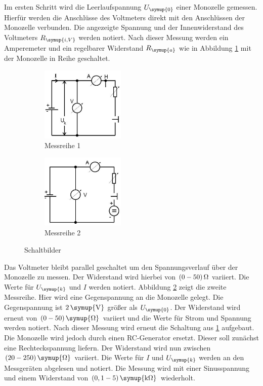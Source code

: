 Im ersten Schritt wird die Leerlaufspannung $U_\symup{0}$ einer Monozelle
gemessen. Hierfür werden die Anschlüsse des Voltmeters direkt mit den Anschlüssen
der Monozelle verbunden. Die angezeigte Spannung und der Innenwiderstand des
Voltmeters $R_\symup{i,V}$ werden notiert.
Nach dieser Messung werden ein Amperemeter und ein regelbarer Widerstand
$R_\symup{a}$ wie in Abbildung \ref{fig:schlt1} mit der Monozelle in Reihe geschaltet.
\begin{figure}[H]
  \centering
  \begin{subfigure}{0.48\textwidth}
    \centering
    \includegraphics[width=4cm]{bilder/sinrecht.jpg}
    \caption{Messreihe 1}
    \label{fig:schlt1}
  \end{subfigure}
  \begin{subfigure}{0.48\textwidth}
    \centering
    \includegraphics[width=4cm]{bilder/gegenspannung.jpg}
    \caption{Messreihe 2}
    \label{fig:schlt2}
  \end{subfigure}
  \caption{Schaltbilder \cite{301}}
  \label{fig:schlt}
\end{figure}
Das Voltmeter bleibt parallel geschaltet um den Spannungsverlauf über der
Monozelle zu messen. Der Widerstand wird hierbei von $(0-50)\,\si{\ohm}$
variiert. Die Werte für $U_\symup{k}$ und $I$ werden notiert.
Abbildung \ref{fig:schlt2} zeigt die zweite Messreihe. Hier wird eine
Gegenspannung an die Monozelle gelegt. Die Gegenspannung ist $2\,\symup{\si{\volt}}$
größer als $U_\symup{0}$. Der Widerstand wird erneut von $(0-50)\,\symup{\si{\ohm}}$
variiert und die Werte für Strom und Spannung werden notiert.
Nach dieser Messung wird erneut die Schaltung aus \ref{fig:schlt1} aufgebaut.
Die Monozelle wird jedoch durch einen RC-Generator ersetzt. Dieser soll zunächst
eine Rechteckspannung liefern. Der Widerstand wird nun zwischen $(20-250)\,\symup{\si{\ohm}}$
variiert. Die Werte für $I$ und $U_\symup{k}$ werden an den Messgeräten
abgelesen und notiert.
Die Messung wird mit einer Sinusspannung und einem Widerstand von
$(0,1-5)\,\symup{\si{\kilo\ohm}}$ wiederholt.
\newpage
